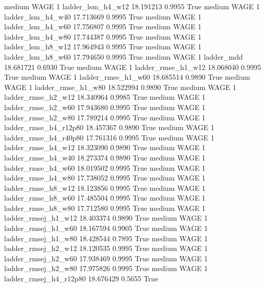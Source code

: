     medium     WAGE                 1      ladder_lsm_h4_w12  18.191213      0.9955    True
    medium     WAGE                 1      ladder_lsm_h4_w40  17.713669      0.9995    True
    medium     WAGE                 1      ladder_lsm_h4_w60  17.756807      0.9995    True
    medium     WAGE                 1      ladder_lsm_h4_w80  17.744387      0.9995    True
    medium     WAGE                 1      ladder_lsm_h8_w12  17.964943      0.9995    True
    medium     WAGE                 1      ladder_lsm_h8_w60  17.794650      0.9995    True
    medium     WAGE                 1             ladder_mdd  18.681721      0.6930    True
    medium     WAGE                 1     ladder_rmse_h1_w12  18.068040      0.9995    True
    medium     WAGE                 1     ladder_rmse_h1_w60  18.685514      0.9890    True
    medium     WAGE                 1     ladder_rmse_h1_w80  18.522994      0.9890    True
    medium     WAGE                 1     ladder_rmse_h2_w12  18.340964      0.9985    True
    medium     WAGE                 1     ladder_rmse_h2_w60  17.943680      0.9995    True
    medium     WAGE                 1     ladder_rmse_h2_w80  17.789214      0.9995    True
    medium     WAGE                 1  ladder_rmse_h4_r12p80  18.457367      0.9890    True
    medium     WAGE                 1  ladder_rmse_h4_r40p80  17.761316      0.9995    True
    medium     WAGE                 1     ladder_rmse_h4_w12  18.323090      0.9890    True
    medium     WAGE                 1     ladder_rmse_h4_w40  18.273374      0.9890    True
    medium     WAGE                 1     ladder_rmse_h4_w60  18.019502      0.9995    True
    medium     WAGE                 1     ladder_rmse_h4_w80  17.738052      0.9995    True
    medium     WAGE                 1     ladder_rmse_h8_w12  18.123856      0.9995    True
    medium     WAGE                 1     ladder_rmse_h8_w60  17.485504      0.9995    True
    medium     WAGE                 1     ladder_rmse_h8_w80  17.712580      0.9995    True
    medium     WAGE                 1    ladder_rmsej_h1_w12  18.403374      0.9890    True
    medium     WAGE                 1    ladder_rmsej_h1_w60  18.167594      0.9905    True
    medium     WAGE                 1    ladder_rmsej_h1_w80  18.428544      0.7895    True
    medium     WAGE                 1    ladder_rmsej_h2_w12  18.120535      0.9995    True
    medium     WAGE                 1    ladder_rmsej_h2_w60  17.938469      0.9995    True
    medium     WAGE                 1    ladder_rmsej_h2_w80  17.975826      0.9995    True
    medium     WAGE                 1 ladder_rmsej_h4_r12p80  18.676429      0.5655    True
